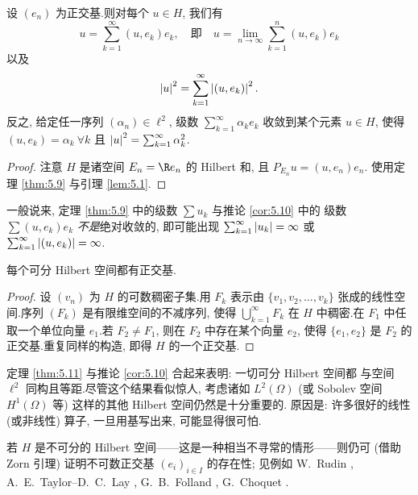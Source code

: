 \begin{keycorollary}
\label{cor:5.10}
设 $(e_n)$ 为正交基.则对每个 $u\in H$, 我们有
\begin{equation*}
u=\sum_{k=1}^\infty(u,e_k)e_k,
\quad\text{即}\quad u=\lim_{n\to\infty}\sum_{k=1}^n(u,e_k)e_k
\end{equation*}
以及
\begin{equation*}
\left|u\right|^2=\sum_{k=1}^\infty\left|(u,e_k)\right|^2.
\end{equation*}
反之, 给定任一序列 $(\alpha_n)\in\ell^2$, 级数 $\sum_{k=1}^\infty\alpha_ke_k$
收敛到某个元素 $u\in H$, 使得 $(u,e_k)=\alpha_k\ \forall k$ 且
$\left|u\right|^2=\sum_{k=1}^\infty\alpha_k^2$.
\end{keycorollary}

\begin{proof}
注意 $H$ 是诸空间 $E_n=\R e_n$ 的 Hilbert 和, 且 $P_{E_n}u=(u,e_n)e_n$.
使用定理  \ref{thm:5.9} 与引理  \ref{lem:5.1}.
\end{proof}

\begin{remark}
\label{rem:5.9}
一般说来, 定理  \ref{thm:5.9} 中的级数 $\sum u_k$ 与推论  \ref{cor:5.10} 中的
级数 $\sum(u,e_k)e_k$ \emph{不是}绝对收敛的, 即可能出现
$\sum_{k=1}^\infty\left|u_k\right|=\infty$ 或
$\sum_{k=1}^\infty\left|(u,e_k)\right|=\infty$.
\end{remark}

\begin{keytheorem}
\label{thm:5.11}
每个可分 Hilbert 空间都有正交基.
\end{keytheorem}

\begin{proof}
设 $(v_n)$ 为 $H$ 的可数稠密子集.用 $F_k$ 表示由
$\{v_1,v_2,\dots,v_k\}$ 张成的线性空间.序列 $(F_k)$ 是有限维空间的不减序列,
使得 $\bigcup_{k=1}^\infty F_k$ 在 $H$ 中稠密.在 $F_1$ 中任取一个单位向量
$e_1$.若 $F_2\ne F_1$, 则在 $F_2$ 中存在某个向量 $e_2$, 使得 $\{e_1,e_2\}$ 是
$F_2$ 的正交基.重复同样的构造, 即得 $H$ 的一个正交基.
\end{proof}

\begin{remark}
\label{rem:5.10}
定理  \ref{thm:5.11} 与推论  \ref{cor:5.10} 合起来表明: 一切可分 Hilbert 空间都
与空间 $\ell^2$ 同构且等距.尽管这个结果看似惊人, 考虑诸如 $L^2(\Omega)$
(或 Sobolev 空间 $H^1(\Omega)$ 等) 这样的其他 Hilbert 空间仍然是十分重要的.
原因是: 许多很好的线性 (或非线性) 算子, 一旦用基写出来, 可能显得很可怕.
\end{remark}

\begin{remark}
\label{rem:5.11}
若 $H$ 是不可分的 Hilbert 空间——这是一种相当不寻常的情形——则仍可 (借助
Zorn 引理) 证明不可数正交基 $(e_i)_{i\in I}$ 的存在性; 见例如 W.~Rudin
, A.~E.~Taylor--D.~C.~Lay , G.~B.~Folland , G.~Choquet .
\end{remark}
